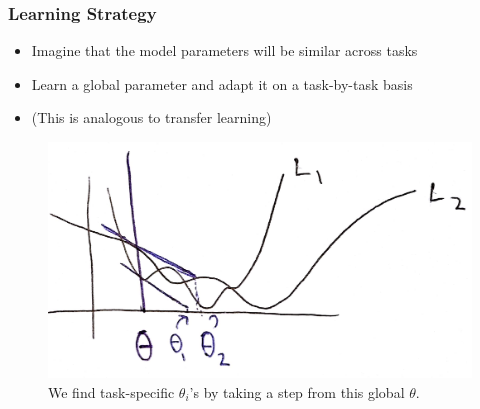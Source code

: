 \documentclass[10pt,mathserif]{beamer}
\begin{document}
\begin{frame}
  \frametitle{Learning Strategy}
 \begin{itemize}
 \item Imagine that the model parameters will be similar across tasks
 \item Learn a global parameter and adapt it on a task-by-task basis
 \item (This is analogous to transfer learning)
   \end{itemize}
\begin{figure}[ht]
  \centering
  \includegraphics[width=0.6\paperwidth]{figure/maml_learning_2}
  \caption{We find task-specific $\theta_i$'s by taking a step from this global
    $\theta$. \label{fig:maml_learning_3} }
\end{figure}
\end{frame}
\end{document}
